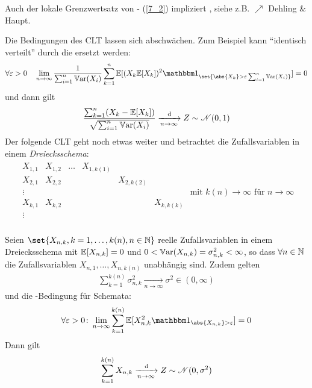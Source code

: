 \begin{*remark}
	Auch der lokale Grenzwertsatz von - (\cref{7_2}) impliziert , siehe z.B. $\nearrow$ Dehling \& Haupt.
\end{*remark}
Die Bedingungen des CLT lassen sich abschwächen. Zum Beispiel kann ``identisch verteilt'' durch die  ersetzt werden:
\begin{align*}
	\forall \epsilon > 0 \quad \lim_{n \to \infty} \frac{1}{\sum_{i=1}^n \Var(X_i)} \sum_{k=1}^n \E[(X_k \E[X_k])^2 \indi_{\set{\abs{X_k} > \epsilon \sum_{i=1}^n \Var(X_i)}}] = 0
\end{align*}
und dann gilt
\begin{align*}
	\frac{\sum_{k=1}^n (X_k - \mathbb{E}[X_k])}{\sqrt{\sum_{i=1}^n \mathbb{V}\text{ar}(X_i)}} \xrightarrow[n \to \infty]{\,\mathrm{d}} Z \sim \mathscr N(0,1)
\end{align*}
Der folgende CLT geht noch etwas weiter und  betrachtet die Zufallsvariablen in einem \emph{Dreiecksschema}:
\begin{align*}
\begin{matrix}
X_{1,1} & X_{1,2} & \dots & X_{1,k(1)} &            & \\
X_{2,1} & X_{2,2} &       &            & X_{2,k(2)} &\\
\vdots  &         &       &            &            &\\
X_{k,1} & X_{k,2} &       &            &            & X_{k,k(k)}\\
\vdots  &         &       &            &            &\\
\end{matrix} \text{ mit } k(n) \to \infty \text{ für } n \to \infty
\end{align*}
\begin{proposition}
	Seien $\set{X_{n,k}, k=1,\dots,k(n),n \in \N}$ reelle Zufallsvariablen in einem Dreiecksschema mit $\mathbb{E}[X_{n,k}] = 0$ und $0 < \mathbb{V}\text{ar}(X_{n,k}) = \sigma_{n,k}^2 < \infty$, so dass $\forall n \in \mathbb{N}$ die Zufallsvariablen $X_{n,1}, \dots, X_{n,k(n)}$ unabhängig sind. Zudem gelten
	\begin{align*}
		\sum_{k=1}^{k(n)} \sigma_{n,k}^2 \xrightarrow[n \to \infty]{} \sigma^2 \in (0,\infty)
	\end{align*}
	und die -Bedingung für Schemata:
	\begin{align*}
		\forall \epsilon >0 \colon \lim_{n \to \infty} \sum_{k=1}^{k(n)} \E[X_{n,k}^2 \indi_{\abs{X_{n,k}}> \epsilon}] = 0
	\end{align*}
	Dann gilt
	\begin{align*}
		\sum_{k=1}^{k(n)} X_{n,k} \xrightarrow[n \to \infty]{\,\mathrm{d}} Z \sim \mathscr N(0, \sigma^2) 
	\end{align*}
\end{proposition}
